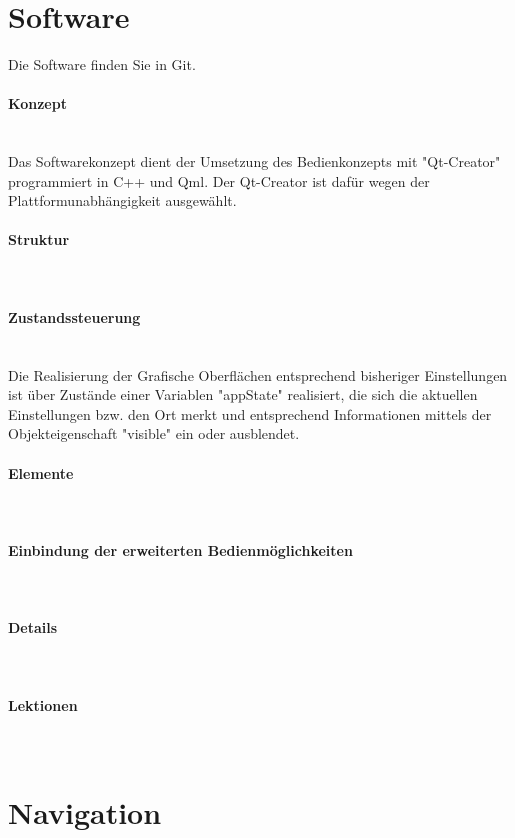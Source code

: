 \section{Software}
Die Software finden Sie in Git.

\paragraph{Konzept}$\;$\\
Das Softwarekonzept dient der Umsetzung des Bedienkonzepts mit "Qt-Creator" programmiert in C++ und Qml. Der Qt-Creator ist dafür wegen der Plattformunabhängigkeit ausgewählt.

\paragraph{Struktur}$\;$\\

\paragraph{Zustandssteuerung}$\;$\\
Die Realisierung der Grafische Oberflächen entsprechend bisheriger Einstellungen ist über Zustände einer Variablen "appState" realisiert, die sich die aktuellen Einstellungen bzw. den Ort merkt und entsprechend Informationen mittels der Objekteigenschaft "visible" ein oder ausblendet.
\paragraph{Elemente}$\;$\\
\paragraph{Einbindung der erweiterten Bedienmöglichkeiten}$\;$\\
\paragraph{Details}$\;$\\
\paragraph{Lektionen}$\;$\\

\section{Navigation}



